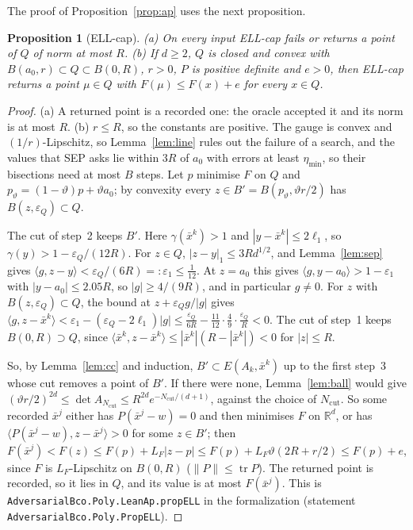 \documentclass[11pt]{amsart}
\newtheorem{proposition}[theorem]{Proposition}
\theoremstyle{definition}
\numberwithin{equation}{section}
\newcommand{\R}{\mathbb{R}}
\newcommand{\tr}{\operatorname{tr}}
\newcommand{\ip}[1]{\langle #1\rangle}
\begin{document}
The proof of Proposition~\ref{prop:ap} uses the next proposition.

\begin{proposition}[ELL-cap]\label{prop:ell}
(a) On every input ELL-cap fails or returns a point of $Q$ of norm at most $R$. (b) If $d\ge2$, $Q$ is closed and convex with $B(a_0,r)\subset Q\subset B(0,R)$, $r>0$, $P$ is positive definite and $e>0$, then ELL-cap returns a point $\mu\in Q$ with $F(\mu)\le F(x)+e$ for every $x\in Q$.
\end{proposition}

\begin{proof}
(a) A returned point is a recorded one: the oracle accepted it and its norm is at most $R$. (b) $r\le R$, so the constants are positive. The gauge is convex and $(1/r)$-Lipschitz, so Lemma~\ref{lem:line} rules out the failure of a search, and the values that SEP asks lie within $3R$ of $a_0$ with errors at least $\eta_{\min}$, so their bisections need at most $B$ steps. Let $p$ minimise $F$ on $Q$ and $p_\vartheta=(1-\vartheta)p+\vartheta a_0$; by convexity every $z\in B'=B(p_\vartheta,\vartheta r/2)$ has $B(z,\varepsilon_Q)\subset Q$.

The cut of step~2 keeps $B'$. Here $\gamma(\bar x^k)>1$ and $|y-\bar x^k|\le2\ell_1$, so $\gamma(y)>1-\varepsilon_Q/(12R)$. For $z\in Q$, $|z-y|_1\le3Rd^{1/2}$, and Lemma~\ref{lem:sep} gives $\ip{g,z-y}<\varepsilon_Q/(6R)=:\varepsilon_1\le\frac1{12}$. At $z=a_0$ this gives $\ip{g,y-a_0}>1-\varepsilon_1$ with $|y-a_0|\le2.05R$, so $|g|\ge4/(9R)$, and in particular $g\ne0$. For $z$ with $B(z,\varepsilon_Q)\subset Q$, the bound at $z+\varepsilon_Qg/|g|$ gives $\ip{g,z-\bar x^k}<\varepsilon_1-(\varepsilon_Q-2\ell_1)|g|\le\frac{\varepsilon_Q}{6R}-\frac{11}{12}\cdot\frac49\cdot\frac{\varepsilon_Q}R<0$. The cut of step~1 keeps $B(0,R)\supset Q$, since $\ip{\bar x^k,z-\bar x^k}\le|\bar x^k|(R-|\bar x^k|)<0$ for $|z|\le R$.

So, by Lemma~\ref{lem:cc} and induction, $B'\subset E(A_k,\bar x^k)$ up to the first step~3 whose cut removes a point of $B'$. If there were none, Lemma~\ref{lem:ball} would give $(\vartheta r/2)^{2d}\le\det A_{N_{\mathrm{cut}}}\le R^{2d}e^{-N_{\mathrm{cut}}/(d+1)}$, against the choice of $N_{\mathrm{cut}}$. So some recorded $\bar x^j$ either has $P(\bar x^j-w)=0$ and then minimises $F$ on $\R^d$, or has $\ip{P(\bar x^j-w),z-\bar x^j}>0$ for some $z\in B'$; then $F(\bar x^j)<F(z)\le F(p)+L_F|z-p|\le F(p)+L_F\vartheta(2R+r/2)\le F(p)+e$, since $F$ is $L_F$-Lipschitz on $B(0,R)$ ($\|P\|\le\tr P$). The returned point is recorded, so it lies in $Q$, and its value is at most $F(\bar x^j)$.
This is \texttt{AdversarialBco.Poly.LeanAp.propELL} in the formalization (statement \texttt{AdversarialBco.Poly.PropELL}).
\end{proof}
\end{document}

